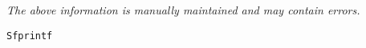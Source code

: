 \label{pkg:sfprintf}

{\tiny \it The above information is manually maintained and may contain errors.}
\begin{verbatim}
Sfprintf
\end{verbatim}
